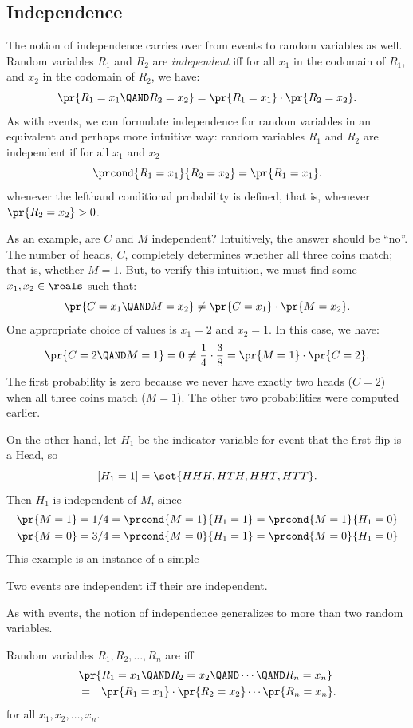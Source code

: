 \subsection{Independence}

The notion of independence carries over from events to random variables as
well.  Random variables $R_1$ and $R_2$ are  \emph{independent} iff for all $x_1$ in the codomain of
$R_1$, and $x_2$ in the codomain of $R_2$, we have:
\[
\pr{R_1 = x_1 \QAND R_2 = x_2}  =  \pr{R_1 = x_1} \cdot \pr{R_2 = x_2}.
\]
As with events, we can formulate independence for random
variables in an equivalent and perhaps more intuitive way: random
variables $R_1$ and $R_2$ are independent if for all $x_1$ and $x_2$
\[
\prcond{R_1 = x_1}{R_2 = x_2}  =  \pr{R_1 = x_1}.
\]
whenever the lefthand conditional probability is defined, that is,
whenever $\pr{R_2 = x_2} > 0$.

As an example, are $C$ and $M$ independent?  Intuitively, the answer
should be ``no''.  The number of heads, $C$, completely determines
whether all three coins match; that is, whether $M = 1$.  But, to
verify this intuition, we must find some $x_1, x_2 \in \reals$
such that:
\[
\pr{C = x_1 \QAND M = x_2} \neq \pr{C = x_1} \cdot \pr{M = x_2}.
\]
One appropriate choice of values is $x_1 = 2$ and $x_2 = 1$.
In this case, we have:
\[
\pr{C = 2 \QAND M = 1} = 0 \neq \dfrac{1}{4} \cdot \dfrac{3}{8} = \pr{M
= 1} \cdot \pr{C = 2}.
\]
The first probability is zero because we never have exactly two heads ($C
= 2$) when all three coins match ($M = 1$).  The other two probabilities
were computed earlier.

On the other hand, let $H_1$ be the indicator variable for event that the
first flip is a Head, so
\[
[H_1 = 1] = \set{HHH, HTH, HHT, HTT}.
\]
Then $H_1$ is independent of $M$, since
\begin{align*}
\pr{M=1} & = 1/4 = \prcond{M=1}{H_1=1} = \prcond{M=1}{H_1=0}\\
\pr{M=0} & = 3/4 = \prcond{M=0}{H_1=1} = \prcond{M=0}{H_1=0}
\end{align*}
This example is an instance of a simple
\begin{lemma}
  Two events are independent iff their  are
  independent.
\end{lemma}
As with events, the notion of independence generalizes to more than two
random variables.
\begin{definition}
Random variables $R_1, R_2, \dots, R_n$ are  iff
\begin{eqnarray*}
\lefteqn{\pr{R_1 = x_1 \QAND R_2 = x_2 \QAND \cdots \QAND R_n = x_n}}\\
        & = & \pr{R_1 = x_1} \cdot \pr{R_2 = x_2} \cdots \pr{R_n = x_n}.
\end{eqnarray*}
for all $x_1, x_2, \dots, x_n$.
\end{definition}

